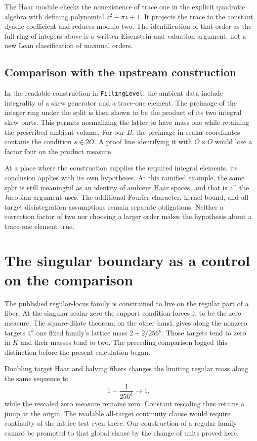 \documentclass[12pt,letterpaper]{article}
\newcommand{\id}[1]{{\small\nolinkurl{#1}}}
\begin{document}
The Haar module checks the nonexistence of trace one in the explicit quadratic algebra with defining polynomial $z^2-\pi z+1$. It projects the trace to the constant dyadic coefficient and reduces modulo two. The identification of that order as the full ring of integers above is a written Eisenstein and valuation argument, not a new Lean classification of maximal orders.

\subsection{Comparison with the upstream construction}
In the readable construction in \id{FillingLevel}, the ambient data include integrality of a skew generator and a trace-one element. The preimage of the integer ring under the split is then shown to be the product of its two integral skew parts. This permits normalizing the latter to have mass one while retaining the prescribed ambient volume. For our $B$, the preimage in scalar coordinates contains the condition $s\in2O$. A proof line identifying it with $O\times O$ would lose a factor four on the product measure.

At a place where the construction supplies the required integral elements, its conclusion applies with its own hypotheses. At this ramified example, the same split is still meaningful as an identity of ambient Haar spaces, and that is all the Jacobian argument uses. The additional Fourier character, kernel bound, and all-target disintegration assumptions remain separate obligations. Neither a correction factor of two nor choosing a larger order makes the hypothesis about a trace-one element true.

\section{The singular boundary as a control on the comparison}
The published regular-locus family is constrained to live on the regular part of a fiber. At the singular scalar zero the support condition forces it to be the zero measure. The square-dilate theorem, on the other hand, gives along the nonzero targets $4^k$ one fixed family's lattice mass $2+2/256^k$. Those targets tend to zero in $K$ and their masses tend to two. The preceding comparison logged this distinction before the present calculation began.

Doubling target Haar and halving fibers changes the limiting regular mass along the same sequence to
\[
                  1+\frac{1}{256^k}\longrightarrow 1,
\]
while the rescaled zero measure remains zero. Constant rescaling thus retains a jump at the origin. The readable all-target continuity clause would require continuity of the lattice test even there. Our construction of a regular family cannot be promoted to that global clause by the change of units proved here.
\end{document}

